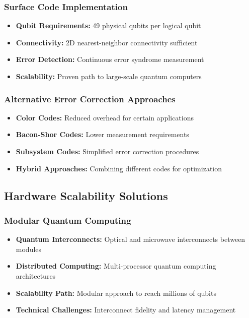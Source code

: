 \documentclass[12pt,a4paper]{article}
\begin{document}
\subsubsection{Surface Code Implementation}
\begin{itemize}
    \item \textbf{Qubit Requirements:} 49 physical qubits per logical qubit
    \item \textbf{Connectivity:} 2D nearest-neighbor connectivity sufficient
    \item \textbf{Error Detection:} Continuous error syndrome measurement
    \item \textbf{Scalability:} Proven path to large-scale quantum computers
\end{itemize}

\subsubsection{Alternative Error Correction Approaches}
\begin{itemize}
    \item \textbf{Color Codes:} Reduced overhead for certain applications
    \item \textbf{Bacon-Shor Codes:} Lower measurement requirements
    \item \textbf{Subsystem Codes:} Simplified error correction procedures
    \item \textbf{Hybrid Approaches:} Combining different codes for optimization
\end{itemize}

\subsection{Hardware Scalability Solutions}

\subsubsection{Modular Quantum Computing}
\begin{itemize}
    \item \textbf{Quantum Interconnects:} Optical and microwave interconnects between modules
    \item \textbf{Distributed Computing:} Multi-processor quantum computing architectures
    \item \textbf{Scalability Path:} Modular approach to reach millions of qubits
    \item \textbf{Technical Challenges:} Interconnect fidelity and latency management
\end{itemize}
\end{document}
